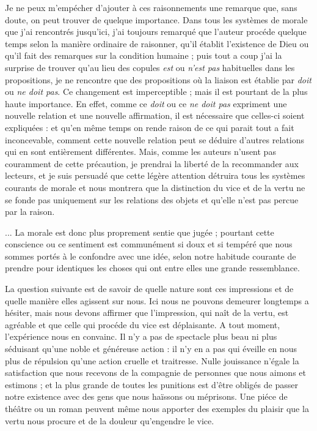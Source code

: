 Je ne peux m’empécher d’ajouter à ces raisonnements une
remarque que, sans doute, on peut trouver de quelque
importance. Dans tous les systèmes de morale que j’ai
rencontrés jusqu’ici, j’ai toujours remarqué que l’auteur
procéde quelque temps selon la manière ordinaire de
raisonner, qu’il établit l'existence de Dieu ou qu’il fait
des remarques sur la condition humaine ; puis tout a coup
j'ai la surprise de trouver qu’au lieu des copules {\it est} ou
{\it n'est pas} habituelles dans les propositions, je ne rencontre
que des propositions où la liaison est établie par {\it doit} ou
{\it ne doit pas}. Ce changement est imperceptible ; mais il est
pourtant de la plus haute importance. En effet, comme ce
{\it doit} ou ce {\it ne doit pas} expriment une nouvelle relation et
une nouvelle affirmation, il est nécessaire que celles-ci
soient expliquées : et qu’en même temps on rende raison
de ce qui parait tout a fait inconcevable, comment cette
nouvelle relation peut se déduire d’autres relations qui
en sont entièrement différentes. Mais, comme les auteurs
n’usent pas couramment de cette précaution, je prendrai
la liberté de la recommander aux lecteurs, et je suis persuadé
que cette légère attention détruira tous les systèmes
courants de morale et nous montrera que la distinction
du vice et de la vertu ne se fonde pas uniquement sur les
relations des objets et qu’elle n’est pas percue par la
raison.

... La morale est donc plus proprement sentie que jugée ;
pourtant cette conscience ou ce sentiment est communément
si doux et si tempéré que nous sommes portés à le
confondre avec une idée, selon notre habitude courante
de prendre pour identiques les choses qui ont entre elles
une grande ressemblance.

La question suivante est de savoir de quelle nature sont
ces impressions et de quelle manière elles agissent sur
nous. Ici nous ne pouvons demeurer longtemps a hésiter,
mais nous devons affirmer que l'impression, qui naît de
la vertu, est agréable et que celle qui procéde du vice est
déplaisante. A tout moment, l'expérience nous en convainc.
Il n’y a pas de spectacle plus beau ni plus séduisant qu’une
noble et généreuse action : il n’y en a pas qui éveille en
nous plus de répulsion qu’une action cruelle et traitresse.
Nulle jouissance n’égale la satisfaction que nous recevons
de la compagnie de personnes que nous aimons et estimons ;
et la plus grande de toutes les punitions est d’être
obligés de passer notre existence avec des gens que nous
haïssons ou méprisons. Une piéce de théâtre ou un roman
peuvent même nous apporter des exemples du plaisir
que la vertu nous procure et de la douleur qu’engendre le
vice.

